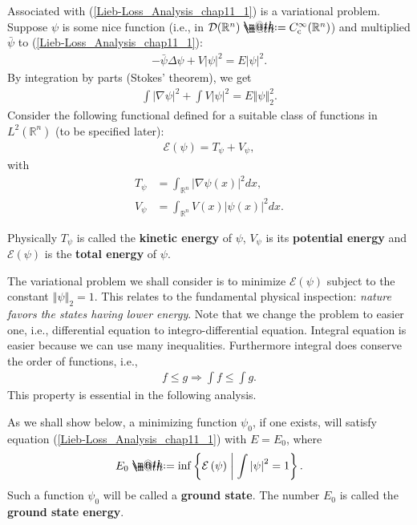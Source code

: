 \documentclass[openany, a4paper, oneside]{jsbook}
\makeatletter
\newcommand*{\defeq}{\mathrel{\rlap{%
\raisebox{0.3ex}{$\m@th\cdot$}}%
\raisebox{-0.3ex}{$\m@th\cdot$}}%
=}
\theoremstyle{break}
\theoremstyle{breakdefn}
\newcommand{\abs}[1]{\left|#1\right|}
\newcommand{\norm}[1]{\left\Vert#1\right\Vert}
\newcommand{\twonorm}[1]{\norm{#1}_2}
\newcommand{\rbk}[1]{\left (#1\right)}
\newcommand{\relmiddle}[1]{\mathrel{}\middle#1\mathrel{}}
\newcommand{\set}[2]{\left\{#1 \relmiddle| #2\right\}}
\newcommand{\bbR}{\mathbb{R}}
\newcommand{\bbRn}{\mathbb{R}^n}
\newcommand{\calD}{\mathcal{D}}
\newcommand{\calE}{\mathcal{E}}
\newcommand{\Ccinfty}{C_{\mathrm{c}}^{\infty}}
\newcommand{\LtwoRn}{L^2 \rbk{\bbR^n}}
\makeatother
\begin{document}
Associated with (\ref{Lieb-Loss_Analysis_chap11_1}) is a variational problem.
Suppose $\psi$ is some nice function (i.e., in $\calD (\bbRn) \defeq \Ccinfty (\bbRn)$) and multiplied $\bar{\psi}$ to (\ref{Lieb-Loss_Analysis_chap11_1}):
\begin{align}
 -\bar{\psi} \Delta \psi + V \abs{\psi}^2 = E \abs{\psi}^2.
\end{align}
By integration by parts (Stokes' theorem), we get
\begin{align}
 \int \abs{\nabla \psi}^2 + \int V \abs{\psi}^2 = E \twonorm{\psi}^2.
\end{align}
Consider the following functional defined for a suitable class of functions in $\LtwoRn$ (to be specified later):
\begin{align}
 \calE \rbk{\psi}
 =
 T_{\psi} + V_{\psi}, \label{Lieb-Loss_Analysis_chap11_3}
\end{align}
with
\begin{align}
 T_{\psi}
 &=
 \int_{\bbR^n} \abs{\nabla \psi (x)}^2 dx, \\
 V_{\psi}
 &=
 \int_{\bbR^n} V (x) \abs{\psi (x)}^2 dx.
\end{align}

Physically $T_{\psi}$ is called the \textbf{kinetic energy} of $\psi$, $V_{\psi}$ is its \textbf{potential energy}
and $\calE (\psi)$ is the \textbf{total energy} of $\psi$.

The variational problem we shall consider is to minimize $\calE (\psi)$ subject to the constant $\twonorm{\psi} = 1$.
This relates to the fundamental physical inspection: \textit{nature favors the states having lower energy}.
Note that we change the problem to easier one, i.e., differential equation to integro-differential equation.
Integral equation is easier because we can use many inequalities.
Furthermore integral does conserve the order of functions, i.e.,
\begin{align}
 f \leq g
 \Longrightarrow
 \int f \leq \int g.
\end{align}
This property is essential in the following analysis.

As we shall show below, a minimizing function $\psi_0$, if one exists, will satisfy equation (\ref{Lieb-Loss_Analysis_chap11_1})
with $E = E_0$, where
\begin{align}
 E_0
 \defeq
 \inf \set{\calE \rbk{\psi}} {\int \abs{\psi}^2 = 1}.
\end{align}
Such a function $\psi_0$ will be called a \textbf{ground state}.
The number $E_0$ is called the \textbf{ground state energy}.
\end{document}
